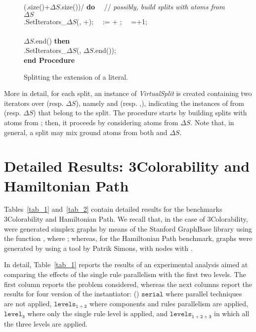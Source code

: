 \documentclass[preprint]{tlp}
\newcommand{\DNF}{\ensuremath{\Delta S}\xspace}
\newcommand{\serial}{\ensuremath{\mathtt{serial}}\xspace}
\newcommand{\kali}{\ensuremath{\mathtt{levels_{1\!+\!2}}}\xspace}
\newcommand{\splitonly}{\ensuremath{\mathtt{level_3}}\xspace}
\newcommand{\paral}{\ensuremath{\mathtt{levels_{1\!+\!2\!+\!3}}}\xspace}
\begin{document}
\begin{figure}[h!]
\begin{tabbing}
   (.size()+\DNF.size())/ {\bf do} \ \ // {\em possibly, build splits with atoms from \DNF}\\
\>\> [].SetIterators\_\DNF(, +); \ \  :=  + ; \ \ =+1;\\
\\
   \DNF.end() {\bf then}\\
\>\> [].SetIterators\_\DNF(, \DNF.end());\\
{\bf end Procedure} \\
\end{tabbing}\vspace{-0.3cm}
\caption{Splitting the extension of a literal.} \vspace{-0.2cm}
\end{figure}\label{fig:splitextension}


\noindent More in detail, for each  split, an instance of {\em VirtualSplit} is created containing two iterators over 
(resp. \DNF), namely  and  (resp.
,), indicating the instances of  from 
(resp. \DNF) that belong to the split. 
The procedure starts by building splits with atoms from ; then, it proceeds
by considering atoms from \DNF. Note that, in general, a split may mix ground atoms 
from both  and \DNF. 

\clearpage

\section{Detailed Results: 3Colorability and Hamiltonian Path}
\label{app:results}

Tables~\ref{tab_1} and~\ref{tab_2} contain detailed results for the benchmarks 3Colorability and Hamiltonian Path.
We recall that, in the case of 3Colorability, were generated  simplex graphs by means of
the Stanford GraphBase library using the function  , where ;
whereas, for the Hamiltonian Path benchmark,  graphs were generated by using
a tool by Patrik Simons, with  nodes  with .

In detail, Table~\ref{tab_1} reports the results of an experimental analysis aimed at comparing the
effects of the single rule parallelism with the first two levels.
The first column reports the problem considered, whereas the
next columns report the results for four version of the instantiator:
() \serial where parallel techniques are not applied,
 \kali where components and rules parallelism are applied,
 \splitonly where only the single rule level is applied, and
 \paral in which all the three levels are applied.
\end{document}
